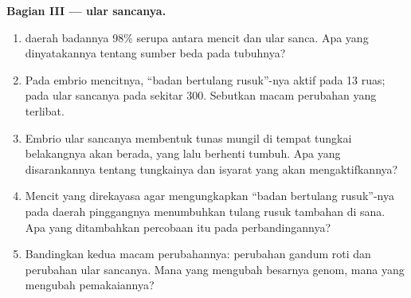 \begin{problem}
\medskip
\noindent\textbf{Bagian III ---  ular sancanya.}
\begin{enumerate}[resume]
  \item {} daerah badannya 98\% serupa antara mencit dan ular sanca.
        Apa yang dinyatakannya tentang sumber beda pada tubuhnya?
  \item Pada embrio mencitnya,  ``badan bertulang rusuk''-nya aktif
        pada 13 ruas; pada ular sancanya pada sekitar 300. Sebutkan
        macam perubahan yang terlibat.
  \item Embrio ular sancanya membentuk tunas mungil di tempat tungkai
        belakangnya akan berada, yang lalu berhenti tumbuh. Apa yang
        disarankannya tentang  tungkainya dan isyarat yang akan
        mengaktifkannya?
  \item Mencit yang direkayasa agar mengungkapkan  ``badan bertulang
        rusuk''-nya pada daerah pinggangnya menumbuhkan tulang rusuk
        tambahan di sana. Apa yang ditambahkan percobaan itu pada
        perbandingannya?
  \item Bandingkan kedua macam perubahannya: perubahan gandum roti dan
        perubahan ular sancanya. Mana yang mengubah besarnya genom, mana
        yang mengubah pemakaiannya?
\end{enumerate}


\end{problem}
